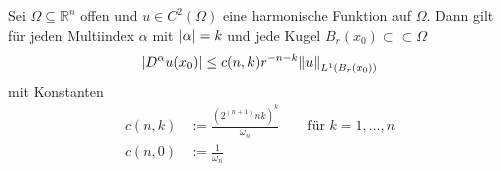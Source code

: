 
\begin{satz}
	Sei $\Omega \subseteq \mathbb{R}^n$ offen und $u \in C^2(\Omega)$ eine harmonische Funktion auf $\Omega$. Dann gilt für jeden Multiindex $\alpha$ mit $ \lvert\alpha\rvert=k$ und jede Kugel $B_r(x_0) \subset \subset \Omega$
	\begin{equation}
		\abs{D^{\alpha}u(x_0)} \leq c(n,k)r^{-n-k} \norm{u}_{L^1(B_r(x_0))}
	\end{equation}
	mit Konstanten 
	\begin{align}
		c(n,k) &:= \frac{\left( 2^{(n+1)}nk \right)^k}{\omega_n} \qquad \text{für }k=1,\dots,n \\
		c(n,0) &:= \frac{1}{\omega_n}
	\end{align}
\end{satz}

